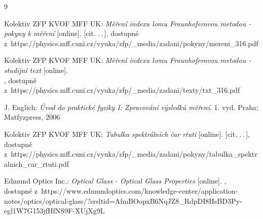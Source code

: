 \documentclass{../concepts/titul_protokol_p/prepareprotokol} %
\renewcommand{\today}{\number\day.\,\number\month.\,\number\year}
\begin{document}
\renewcommand{\today}{\number\day.\,\number\month.\,\number\year}
\begin{thebibliography}{9}

 Kolektiv ZFP KVOF MFF UK: \textit{Měření indexu lomu Fraunhoferovou
metodou - pokyny k měření} [online]. [cit. \today], dostupné 
z~https://physics.mff.cuni.cz/vyuka/zfp/\_media/zadani/pokyny/mereni\_316.pdf

 Kolektiv ZFP KVOF MFF UK: \textit{Měření indexu lomu Fraunhoferovou 
metodou - studijní text} [online]. \\ 
\text{[cit. \today]}, 
dostupné z~https://physics.mff.cuni.cz/vyuka/zfp/\_media/zadani/texty/txt\_316.pdf

 J. Englich: \textit{Úvod do praktické fyziky I: Zpracování výsledků měření}. 
1. vyd. Praha: Matfyzpress, 2006

 Kolektiv ZFP KVOF MFF UK: \textit{Tabulka spektrálních čar rtuti} [online]. 
[cit. \today],
dostupné 
z~https://physics.mff.cuni.cz/vyuka/zfp/\_media/zadani/pokyny/tabulka\_spektralnich\_car\_rtuti.pdf

 Edmund Optics Inc.: \textit{Optical Glass - Optical Glass Properties}
[online]. \text{[cit. \today]}, \\
dostupné z~https://www.edmundoptics.com/knowledge-center/application-notes/optics/optical-glass/?srsltid=AfmBOopxB6NqJZ8\_RdpDI8HsBD3Py-egl1W7G153jfHfNS9F-XUjXg9L

\end{thebibliography}
\end{document}
